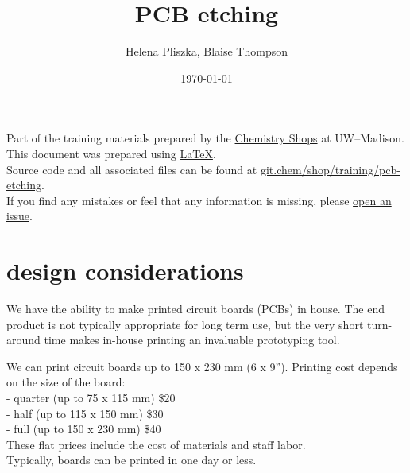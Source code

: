 \documentclass{training}
\title{PCB etching}
\date{\today}
\author{Helena Pliszka, Blaise Thompson}
\begin{document}
\maketitle
\renewcommand{\baselinestretch}{0.5}\normalsize
\tableofcontents
\renewcommand{\baselinestretch}{1.0}\normalsize
\vfill

Part of the training materials prepared by the \href{https://shops.chem.wisc.edu/}{Chemistry Shops} at UW--Madison. \\
This document was prepared using \href{https://www.latex-project.org/}{\LaTeX}. \\
Source code and all associated files can be found at \href{https://git.chem.wisc.edu/shop/training/pcb-etching}{git.chem/shop/training/pcb-etching}. \\
If you find any mistakes or feel that any information is missing, please \href{https://git.chem.wisc.edu/shop/training/pcb-etching/issues}{open an issue}. \\

\clearpage
\section{design considerations}

We have the ability to make printed circuit boards (PCBs) in house.
The end product is not typically appropriate for long term use, but the very short turn-around time makes in-house printing an invaluable prototyping tool.

We can print circuit boards up to 150 x 230 mm (6 x 9''). Printing cost depends on the size of the board: \\
- quarter (up to 75 x 115 mm) \$20 \\
- half (up to 115 x 150 mm) \$30 \\
- full (up to 150 x 230 mm) \$40 \\
These flat prices include the cost of materials and staff labor. \\
Typically, boards can be printed in one day or less.
\end{document}
